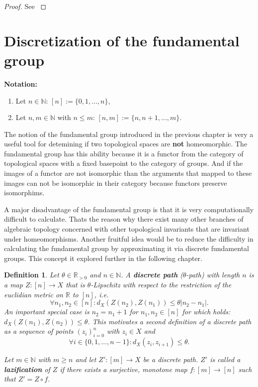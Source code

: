 \documentclass[a4paper, 11pt, twoside]{article}
\newcommand{\R}[0]{\mathbb{R}}
\newcommand{\N}[0]{\mathbb{N}}
\theoremstyle{break}
\theoremstyle{break}
\newtheorem{defin}[thm]{Definition}
\begin{document}
\begin{proof}
  See \cite[p. 175f.]{munkres2000topology}
\end{proof}

\section{Discretization of the fundamental group}
\textbf{Notation:}
\begin{enumerate}
  \item Let $n \in \N$: $[n] := \{0, 1, \ldots, n\}$,
  \item Let $n,m \in \N$ with $n \leq m$: $[n,m] := \{n, n+1, \ldots, m\}$.
\end{enumerate}

The notion of the fundamental group introduced in the previous chapter is very a useful tool for detemining if two topological spaces are \textbf{not} homeomorphic.
The fundamental group has this ability because it is a functor from the category of topological spaces with a fixed basepoint to the category of groups. 
And if the images of a functor are not isomorphic than the arguments that mapped to these images can not be isomorphic in their category because functors preserve isomorphims.

A major disadvantage of the fundamental group is that it is very computationally difficult to calculate.
Thats the reason why there exist many other branches of algebraic topology concerned with other topological invariants that are invariant under homeomorphisms. 
Another fruitful idea would be to reduce the difficulty in calculating the fundamental group by approximating it via discrete fundamental groups. 
This concept it explored further in the following chapter.

\begin{defin} \label{def:discrete-path}
  Let $\theta \in \R_{>0}$ and $n \in \N$. A \textbf{discrete path} ($\theta$-path) with length $n$ is a map $Z: [n] \to X$ that is $\theta$-Lipschitz with respect to the restriction of the euclidian metric on $\R$ to $[n]$, i.e.
  \begin{equation}
    \forall n_1, n_2 \in [n]\colon d_X(Z(n_2), Z(n_1)) \leq \theta |n_2 - n_1|.
  \end{equation}
  An important special case is $n_2 = n_1 + 1$ for $n_1, n_2 \in [n]$ for which holds: $d_X(Z(n_1), Z(n_2)) \leq \theta$. This motivates a second
  definition of a discrete path as a sequence of points $(z_i)_{i=0}^n$ with $z_i \in X$ and
  \begin{equation}
    \forall i \in \{0, 1, \ldots, n-1\} \colon d_X(z_i, z_{i+1}) \leq \theta.
  \end{equation}

  Let $m \in \N$ with $m \geq n$ and let $Z'\colon [m] \to X$ be a discrete path. $Z'$ is called a \textbf{lazification} of $Z$ if there exists a surjective, monotone map 
  $f\colon [m] \to [n]$ such that $Z' = Z \circ f$. 
  
  \cite[p. 3]{vigolo2018fundamental}
\end{defin}
\end{document}
